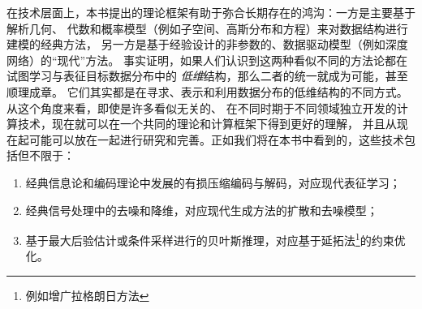 \documentclass[../../book-main_zh.tex]{subfiles}
\begin{document}
在技术层面上，本书提出的理论框架有助于弥合长期存在的鸿沟：一方是主要基于解析几何、
代数和概率模型（例如子空间、高斯分布和方程）来对数据结构进行建模的经典方法，
另一方是基于经验设计的非参数的、数据驱动模型（例如深度网络）的“现代”方法。
事实证明，如果人们认识到这两种看似不同的方法论都在试图学习与表征目标数据分布中的
{\em 低维}结构，那么二者的统一就成为可能，甚至顺理成章。
它们其实都是在寻求、表示和利用数据分布的低维结构的不同方式。从这个角度来看，即使是许多看似无关的、
在不同时期于不同领域独立开发的计算技术，现在就可以在一个共同的理论和计算框架下得到更好的理解，
并且从现在起可能可以放在一起进行研究和完善。正如我们将在本书中看到的，这些技术包括但不限于：
\begin{enumerate}
    \item 经典信息论和编码理论中发展的有损压缩编码与解码，对应现代表征学习；
    \item 经典信号处理中的去噪和降维，对应现代生成方法的扩散和去噪模型；
    \item 基于最大后验估计或条件采样进行的贝叶斯推理，对应基于延拓法\footnote{例如增广拉格朗日方法}的约束优化。
\end{enumerate}
\end{document}
